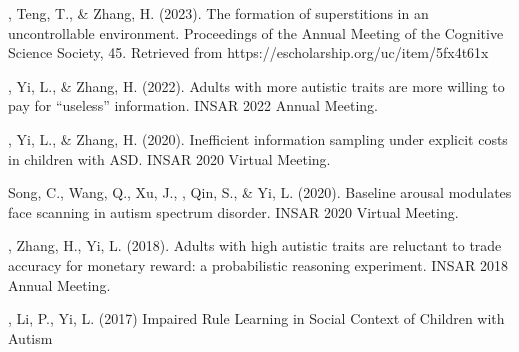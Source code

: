 \begin{etaremune}
  \item \ME, Teng, T., \& Zhang, H. (2023). The formation of superstitions in an uncontrollable environment. Proceedings of the Annual Meeting of the Cognitive Science Society, 45. Retrieved from https://escholarship.org/uc/item/5fx4t61x
  \item \ME, Yi, L., \& Zhang, H. (2022). Adults with more autistic traits are more willing to pay for “useless” information. INSAR 2022 Annual Meeting.
  \item \ME, Yi, L., \& Zhang, H. (2020). Inefficient information sampling under explicit costs in children with ASD. INSAR 2020 Virtual Meeting.
  \item Song, C., Wang, Q., Xu, J., \ME, Qin, S., \& Yi, L. (2020). Baseline arousal modulates face scanning in autism spectrum disorder. INSAR 2020 Virtual Meeting.
  \item \ME, Zhang, H., Yi, L. (2018). Adults with high autistic traits are reluctant to trade accuracy for monetary reward: a probabilistic reasoning experiment. INSAR 2018 Annual Meeting.
  \item \ME, Li, P., Yi, L. (2017) Impaired Rule Learning in Social Context of Children with Autism
\end{etaremune}

